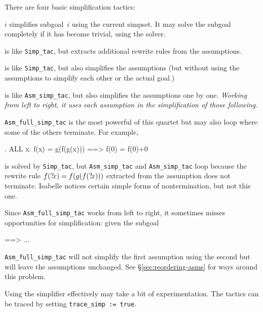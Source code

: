 There are four basic simplification tactics:
\begin{ttdescription}
\item[\ttindexbold{Simp_tac} $i$] simplifies subgoal~$i$ using the current
  simpset.  It may solve the subgoal completely if it has become trivial,
  using the solver.
  
\item[\ttindexbold{Asm_simp_tac}]
  is like \verb$Simp_tac$, but extracts additional rewrite rules from the
  assumptions.

\item[\ttindexbold{Full_simp_tac}] is like \verb$Simp_tac$, but also
  simplifies the assumptions (but without using the assumptions to simplify
  each other or the actual goal.)

\item[\ttindexbold{Asm_full_simp_tac}]
  is like \verb$Asm_simp_tac$, but also simplifies the assumptions one by
  one.  {\em Working from left to right, it uses each assumption in the
  simplification of those following.}
\end{ttdescription}

{\tt Asm_full_simp_tac} is the most powerful of this quartet but may also
loop where some of the others terminate.  For example,
\begin{ttbox}
{. ALL x. f(x) = g(f(g(x))) ==> f(0) = f(0)+0}
\end{ttbox}
is solved by {\tt Simp_tac}, but {\tt Asm_simp_tac} and {\tt Asm_simp_tac}
loop because the rewrite rule $f({?\!x}) = f(g(f({?\!x})))$ extracted from
the assumption does not terminate.  Isabelle notices certain simple forms of
nontermination, but not this one.
 
\begin{warn}
  Since \verb$Asm_full_simp_tac$ works from left to right, it sometimes
misses opportunities for simplification: given the subgoal
\begin{ttbox}
{\out [| P(f(a)); f(a) = t |] ==> ...}
\end{ttbox}
\verb$Asm_full_simp_tac$ will not simplify the first assumption using the
second but will leave the assumptions unchanged.  See
\S\ref{sec:reordering-asms} for ways around this problem.
\end{warn}

Using the simplifier effectively may take a bit of experimentation.
 The tactics can
be traced by setting \verb$trace_simp := true$.

